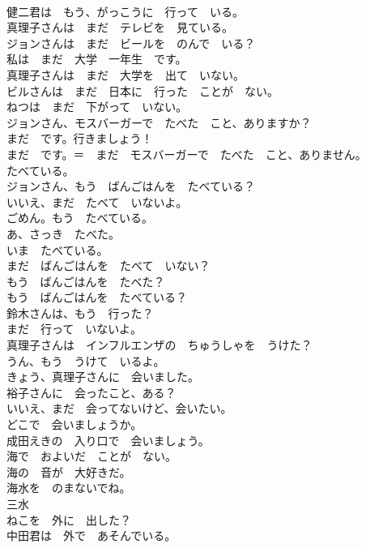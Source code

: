 \documentclass[8pt]{extreport}
\begin{document}
\begin{CJK}{UTF8}{min}
\\	健二君は　もう、がっこうに　行って　いる。	
\\	真理子さんは　まだ　テレビを　見ている。	
\\	ジョンさんは　まだ　ビールを　のんで　いる？	
\\	私は　まだ　大学　一年生　です。	
\\	真理子さんは　まだ　大学を　出て　いない。	
\\	ビルさんは　まだ　日本に　行った　ことが　ない。	
\\	ねつは　まだ　下がって　いない。	
\\	ジョンさん、モスバーガーで　たべた　こと、ありますか？	
\\	まだ　です。行きましょう！	
\\	まだ　です。＝　まだ　モスバーガーで　たべた　こと、ありません。	
\\	たべている。	
\\	ジョンさん、もう　ばんごはんを　たべている？	
\\	いいえ、まだ　たべて　いないよ。	
\\	ごめん。もう　たべている。	
\\	あ、さっき　たべた。	
\\	いま　たべている。	
\\	まだ　ばんごはんを　たべて　いない？	
\\	もう　ばんごはんを　たべた？	
\\	もう　ばんごはんを　たべている？	
\\	鈴木さんは、もう　行った？	
\\	まだ　行って　いないよ。	
\\	真理子さんは　インフルエンザの　ちゅうしゃを　うけた？	
\\	うん、もう　うけて　いるよ。	
\\	きょう、真理子さんに　会いました。	
\\	裕子さんに　会ったこと、ある？	
\\	いいえ、まだ　会ってないけど、会いたい。	
\\	どこで　会いましょうか。	
\\	成田えきの　入り口で　会いましょう。	
\\	海で　およいだ　ことが　ない。	
\\	海の　音が　大好きだ。	
\\	海水を　のまないでね。	
\\	三水	
\\	ねこを　外に　出した？	
\\	中田君は　外で　あそんでいる。	

\end{CJK}
\end{document}
